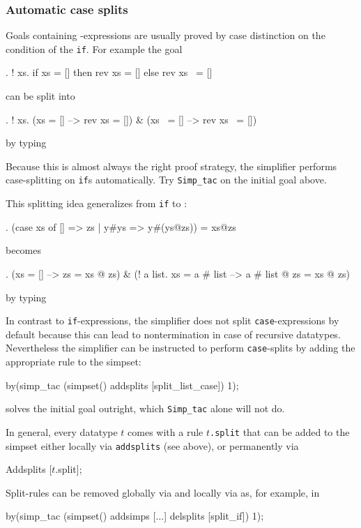 \subsubsection{Automatic case splits}

Goals containing -expressions are usually proved by case
distinction on the condition of the \texttt{if}. For example the goal
\begin{ttbox}
{. ! xs. if xs = [] then rev xs = [] else rev xs ~= []}
\end{ttbox}
can be split into
\begin{ttbox}
{. ! xs. (xs = [] --> rev xs = []) \& (xs ~= [] --> rev xs ~= [])}
\end{ttbox}
by typing
\begin{ttbox}
\end{ttbox}
Because this is almost always the right proof strategy, the simplifier
performs case-splitting on \texttt{if}s automatically. Try \texttt{Simp_tac}
on the initial goal above.

This splitting idea generalizes from \texttt{if} to :
\begin{ttbox}\makeatother
{. (case xs of [] => zs | y#ys => y#(ys@zs)) = xs@zs}
\end{ttbox}
becomes
\begin{ttbox}\makeatother
{. (xs = [] --> zs = xs @ zs) &}
{\out    (! a list. xs = a # list --> a # list @ zs = xs @ zs)}
\end{ttbox}
by typing
\begin{ttbox}
\end{ttbox}
In contrast to \texttt{if}-expressions, the simplifier does not split
\texttt{case}-expressions by default because this can lead to nontermination
in case of recursive datatypes.
Nevertheless the simplifier can be instructed to perform \texttt{case}-splits
by adding the appropriate rule to the simpset:
\begin{ttbox}
by(simp_tac (simpset() addsplits [split_list_case]) 1);
\end{ttbox}
solves the initial goal outright, which \texttt{Simp_tac} alone will not do.

In general, every datatype $t$ comes with a rule
\texttt{$t$.split} that can be added to the simpset either
locally via \texttt{addsplits} (see above), or permanently via
\begin{ttbox}
Addsplits [\(t\).split];
\end{ttbox}
Split-rules can be removed globally via  and locally
via  as, for example, in
\begin{ttbox}
by(simp_tac (simpset() addsimps [\(\dots\)] delsplits [split_if]) 1);
\end{ttbox}



